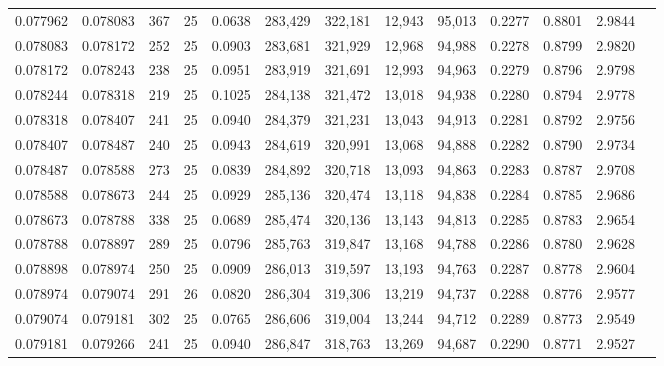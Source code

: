 \begin{tabular}{rrrrrrrrrrrrr}
0.077962 & 0.078083 &   367 &  25 &                                     0.0638 & 283,429 & 322,181 &  12,943 &  95,013 & 0.2277 & 0.8801 & 2.9844 \\
0.078083 & 0.078172 &   252 &  25 &                                     0.0903 & 283,681 & 321,929 &  12,968 &  94,988 & 0.2278 & 0.8799 & 2.9820 \\
0.078172 & 0.078243 &   238 &  25 &                                     0.0951 & 283,919 & 321,691 &  12,993 &  94,963 & 0.2279 & 0.8796 & 2.9798 \\
0.078244 & 0.078318 &   219 &  25 &                                     0.1025 & 284,138 & 321,472 &  13,018 &  94,938 & 0.2280 & 0.8794 & 2.9778 \\
0.078318 & 0.078407 &   241 &  25 &                                     0.0940 & 284,379 & 321,231 &  13,043 &  94,913 & 0.2281 & 0.8792 & 2.9756 \\
0.078407 & 0.078487 &   240 &  25 &                                     0.0943 & 284,619 & 320,991 &  13,068 &  94,888 & 0.2282 & 0.8790 & 2.9734 \\
0.078487 & 0.078588 &   273 &  25 &                                     0.0839 & 284,892 & 320,718 &  13,093 &  94,863 & 0.2283 & 0.8787 & 2.9708 \\
0.078588 & 0.078673 &   244 &  25 &                                     0.0929 & 285,136 & 320,474 &  13,118 &  94,838 & 0.2284 & 0.8785 & 2.9686 \\
0.078673 & 0.078788 &   338 &  25 &                                     0.0689 & 285,474 & 320,136 &  13,143 &  94,813 & 0.2285 & 0.8783 & 2.9654 \\
0.078788 & 0.078897 &   289 &  25 &                                     0.0796 & 285,763 & 319,847 &  13,168 &  94,788 & 0.2286 & 0.8780 & 2.9628 \\
0.078898 & 0.078974 &   250 &  25 &                                     0.0909 & 286,013 & 319,597 &  13,193 &  94,763 & 0.2287 & 0.8778 & 2.9604 \\
0.078974 & 0.079074 &   291 &  26 &                                     0.0820 & 286,304 & 319,306 &  13,219 &  94,737 & 0.2288 & 0.8776 & 2.9577 \\
0.079074 & 0.079181 &   302 &  25 &                                     0.0765 & 286,606 & 319,004 &  13,244 &  94,712 & 0.2289 & 0.8773 & 2.9549 \\
0.079181 & 0.079266 &   241 &  25 &                                     0.0940 & 286,847 & 318,763 &  13,269 &  94,687 & 0.2290 & 0.8771 & 2.9527 \\

\end{tabular}
